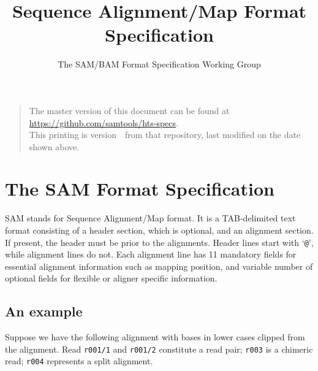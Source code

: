 \documentclass[10pt]{article}
\begin{document}

\title{Sequence Alignment/Map Format Specification}
\author{The SAM/BAM Format Specification Working Group}
\date{\headdate}
\maketitle
\begin{quote}\small
The master version of this document can be found at
\url{https://github.com/samtools/hts-specs}.\\
This printing is version~\commitdesc\ from that repository,
last modified on the date shown above.
\end{quote}
\vspace*{1em}


\section{The SAM Format Specification}
SAM stands for Sequence Alignment/Map format. It is a TAB-delimited text
format consisting of a header section, which is optional, and an
alignment section. If present, the header must be prior to the
alignments. Header lines start with `{\tt @}', while alignment lines do
not. Each alignment line has 11 mandatory fields for essential alignment
information such as mapping position, and variable number of optional
fields for flexible or aligner specific information.

\subsection{An example}\label{sec:example}
Suppose we have the following alignment with bases in lower cases
clipped from the alignment. Read {\tt r001/1} and {\tt r001/2}
constitute a read pair; {\tt r003} is a chimeric read; {\tt r004}
represents a split alignment.
\end{document}
